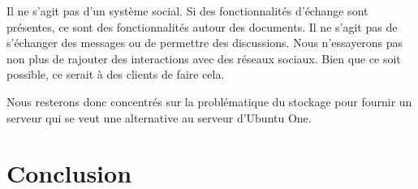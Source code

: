 \documentclass[12pt]{report}
\begin{document}
Il ne s'agit pas d'un système social. Si des fonctionnalités d'échange sont présentes, ce sont des fonctionnalités autour des documents. Il ne s'agit pas de s'échanger des messages ou de permettre des discussions. Nous n'essayerons pas non plus de rajouter des interactions avec des réseaux sociaux. Bien que ce soit possible, ce serait à des clients de faire cela.

Nous resterons donc concentrés sur la problématique du stockage pour fournir un serveur qui se veut une alternative au serveur d'Ubuntu One.

\chapter{Conclusion}
\thispagestyle{EIP}


\end{document}
